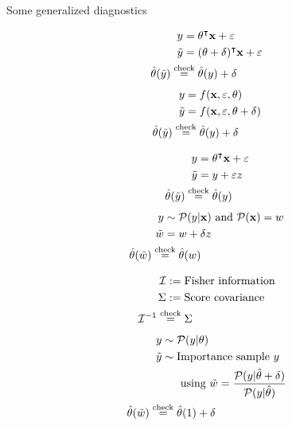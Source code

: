 \begin{frame}{Some generalized diagnostics}

\vspace{2em}

{
$$
\begin{aligned}
    y ={}& \theta^\intercal \mathbf{x} + \varepsilon \\
    \tilde{y} ={}& (\theta + \delta)^\intercal \mathbf{x} + \varepsilon \\
    \hat{\theta}(\tilde{y}) \overset{\textrm{check}}{=}{}& \hat{\theta}(y) + \delta
\end{aligned}
$$
}{
$$
\begin{aligned}
    y ={}& f(\mathbf{x}, \varepsilon, \theta) \\
    \tilde{y} ={}& f(\mathbf{x}, \varepsilon, \theta + \delta) \\
    \hat{\theta}(\tilde{y}) \overset{\textrm{check}}{=}{}& \hat{\theta}(y) + \delta
\end{aligned}
$$
}

\methodspacer

{
$$
\begin{aligned}
    y ={}& \theta^\intercal \mathbf{x} + \varepsilon \\
    \tilde{y} ={}& y + \varepsilon z \\
    \hat{\theta}(\tilde{y}) \overset{\textrm{check}}{=}{}& \hat{\theta}(y)
\end{aligned}
$$
}{
$$
\begin{aligned}
    y \sim{}& \mathcal{P}(y \vert \mathbf{x}) \textrm{ and } \mathcal{P}(\mathbf{x}) ={} w \\
    \tilde{w} ={}& w + \delta z \\
    \hat{\theta}(\tilde{w}) \overset{\textrm{check}}{=}{}& \hat{\theta}(w)
\end{aligned}
$$
}


\methodspacer


{
$$
\begin{aligned}
    \mathcal{I} :={}& \textrm{Fisher information}\\
    \Sigma :={}& \textrm{Score covariance} \\
    \mathcal{I}^{-1} \overset{\textrm{check}}{=}{}& \Sigma
\end{aligned}
$$
}{
$$
\begin{aligned}
    y \sim{}& \mathcal{P}(y \vert \theta) \\
    \tilde{y} \sim{}& \textrm{Importance sample }y\\
    &\textrm{ using }\tilde{w} ={} \frac{\mathcal{P}(y \vert \hat{\theta} + \delta)}{\mathcal{P}(y \vert \hat{\theta})} \\
    \hat{\theta}(\tilde{w}) \overset{\textrm{check}}{=}{}& \hat{\theta}(1) + \delta
\end{aligned}
$$
}


\vspace{2em}


\end{frame}





